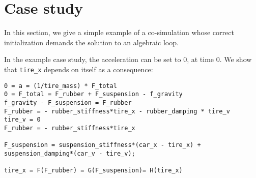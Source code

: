 \section{Case study}
In this section, we give a simple example of a co-simulation whose correct initialization demands the solution to an algebraic loop.

In the example case study, the acceleration can be set to 0, at time 0.
We show that \verb|tire_x| depends on itself as a consequence:
\begin{verbatim}
0 = a = (1/tire_mass) * F_total
0 = F_total = F_rubber + F_suspension - f_gravity
f_gravity - F_suspension = F_rubber
F_rubber = - rubber_stiffness*tire_x - rubber_damping * tire_v
tire_v = 0
F_rubber = - rubber_stiffness*tire_x

F_suspension = suspension_stiffness*(car_x - tire_x) + suspension_damping*(car_v - tire_v);

tire_x = F(F_rubber) = G(F_suspension)= H(tire_x)
\end{verbatim}
